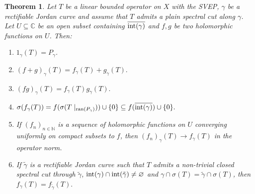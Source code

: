 \documentclass[11pt]{amsart}
\newtheorem{theorem}{Theorem}[section]
\theoremstyle{definition}
\theoremstyle{remark}
\numberwithin{equation}{section}
\newcommand{\ran}{\textnormal{ran}}
\newcommand{\C}{\mathbb{C}}
\newcommand{\N}{\mathbb{N}}
\newcommand{\inte}{\textnormal{int}}
\begin{document}
\smallskip
	
\begin{theorem}\label{Teorema CF}
		Let $T$ be a linear bounded operator on $X$ with the SVEP, $\gamma$ be a rectifiable Jordan curve and assume that $T$ admits a plain spectral cut along $\gamma$. Let $U\subseteq  \C$ be an open subset containing $\overline{\inte(\gamma)}$ and $f, g$ be two holomorphic functions on $U$. Then:
\begin{enumerate}
			\item [\rm{(i)}] $1_\gamma(T) = P_\gamma$.
			\item [\rm{(ii)}] $(f+g)_\gamma(T) = f_\gamma(T)+g_\gamma(T).$
			\item [\rm{(iii)}] $(fg)_\gamma(T) = f_\gamma(T)g_\gamma(T). $
			\item [\rm{(iv)}] $\sigma(f_\gamma (T)) = f(\sigma(T\mid_{\ran(P_\gamma)}))\cup \{0\}\subseteq   f(\overline{\inte(\gamma)})\cup \{0\}.$
			\item [\rm{(v)}] If $(f_n)_{n\in \N}$ is a sequence of holomorphic functions on $U$ converging uniformly on compact subsets to $f$, then $(f_n)_\gamma(T) \rightarrow f_\gamma(T)$ in the operator norm.
			\item [\rm{(vi)}] If $\tilde{\gamma}$ is a rectifiable Jordan curve such that $T$ admits a non-trivial closed spectral cut through $\tilde{\gamma}$, $\inte(\gamma)\cap\inte(\tilde{\gamma}) \neq \varnothing$ and $\gamma \cap \sigma(T) = \tilde{\gamma}\cap \sigma(T)$,  then $f_\gamma(T) = f_{\tilde{\gamma}}(T).$
		\end{enumerate}
	\end{theorem}

\smallskip
\end{document}
